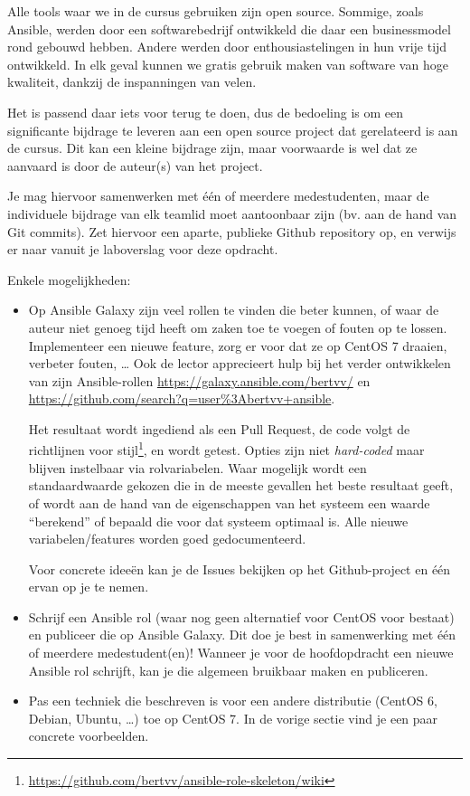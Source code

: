 Alle tools waar we in de cursus gebruiken zijn open source. Sommige, zoals Ansible, werden door een softwarebedrijf ontwikkeld die daar een businessmodel rond gebouwd hebben. Andere werden door enthousiastelingen in hun vrije tijd ontwikkeld. In elk geval kunnen we gratis gebruik maken van software van hoge kwaliteit, dankzij de inspanningen van velen.

Het is passend daar iets voor terug te doen, dus de bedoeling is om een significante bijdrage te leveren aan een open source project dat gerelateerd is aan de cursus. Dit kan een kleine bijdrage zijn, maar voorwaarde is wel dat ze aanvaard is door de auteur(s) van het project.

Je mag hiervoor samenwerken met één of meerdere medestudenten, maar de individuele bijdrage van elk teamlid moet aantoonbaar zijn (bv. aan de hand van Git commits). Zet hiervoor een aparte, publieke Github repository op, en verwijs er naar vanuit je laboverslag voor deze opdracht.

Enkele mogelijkheden:

\begin{itemize}
  \item Op Ansible Galaxy zijn veel rollen te vinden die beter kunnen, of waar de auteur niet genoeg tijd heeft om zaken toe te voegen of fouten op te lossen. Implementeer een nieuwe feature, zorg er voor dat ze op CentOS 7 draaien, verbeter fouten, \ldots{} Ook de lector apprecieert hulp bij het verder ontwikkelen van zijn Ansible-rollen \url{https://galaxy.ansible.com/bertvv/} en \url{https://github.com/search?q=user\%3Abertvv+ansible}.

  Het resultaat wordt ingediend als een Pull Request, de code volgt de richtlijnen voor stijl\footnote{\url{https://github.com/bertvv/ansible-role-skeleton/wiki}}, en wordt getest. Opties zijn niet \emph{hard-coded} maar blijven instelbaar via rolvariabelen. Waar mogelijk wordt een standaardwaarde gekozen die in de meeste gevallen het beste resultaat geeft, of wordt aan de hand van de eigenschappen van het systeem een waarde ``berekend'' of bepaald die voor dat systeem optimaal is. Alle nieuwe variabelen/features worden goed gedocumenteerd.
  
  Voor concrete ideeën kan je de Issues bekijken op het Github-project en één ervan op je te nemen.

  \item Schrijf een Ansible rol (waar nog geen alternatief voor CentOS voor bestaat) en publiceer die op Ansible Galaxy. Dit doe je best in samenwerking met één of meerdere medestudent(en)! Wanneer je voor de hoofdopdracht een nieuwe Ansible rol schrijft, kan je die algemeen bruikbaar maken en publiceren.
  
  \item Pas een techniek die beschreven is voor een andere distributie (CentOS 6, Debian, Ubuntu, \ldots{}) toe op CentOS 7. In de vorige sectie vind je een paar concrete voorbeelden.
\end{itemize}

